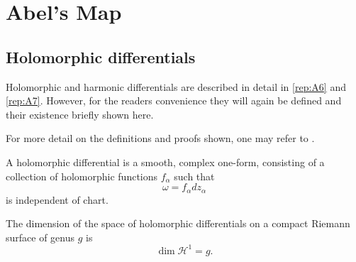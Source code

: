 \section{Abel's Map}\label{secB12:Abel}

\subsection{Holomorphic differentials}
Holomorphic and harmonic differentials are described in detail in \ref{rep:A6} and \ref{rep:A7}. However, for the readers convenience they will again be defined and their existence briefly shown here.

For more detail on the definitions and proofs shown, one may refer to \cite{Ber06}.

\begin{definition}
    A holomorphic differential is a smooth, complex one-form, consisting of a collection of holomorphic functions $f_\alpha$ such that
    \begin{equation}
        \omega = f_\alpha dz_\alpha
    \end{equation}
    is independent of chart.
\end{definition}

\begin{theorem}
    The dimension of the space of holomorphic differentials on a compact Riemann surface of genus $g$ is
    \begin{equation}
        \dim \mathcal H^1 = g.
    \end{equation}
\end{theorem}

